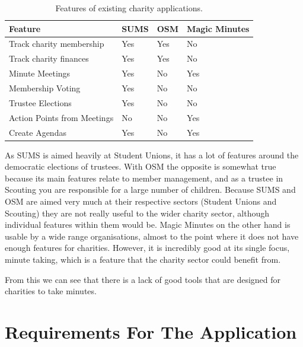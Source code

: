 \documentclass{UoYCSproject}
\begin{document}
\begin{table}[]
\begin{center}
\caption{ Features of existing charity applications.}
\label{table:existing_solutions}
\begin{tabular}{llll}
\textbf{Feature}            & \textbf{SUMS} & \textbf{OSM} & \textbf{Magic Minutes} \\ \hline
Track charity membership    & Yes           & Yes          & No                     \\
Track charity finances      & Yes           & Yes          & No                     \\
Minute Meetings             & Yes           & No           & Yes                    \\
Membership Voting           & Yes           & No           & No                     \\
Trustee Elections           & Yes           & No           & No                     \\
Action Points from Meetings & No            & No           & Yes                    \\
Create Agendas              & Yes           & No           & Yes                   
\end{tabular}
\end{center}
\end{table}

As SUMS is aimed heavily at Student Unions, it has a lot of features around the democratic elections of trustees. With OSM the opposite is somewhat true because its main features relate to member management, and as a trustee in Scouting you are responsible for a large number of children. Because SUMS and OSM are aimed very much at their respective sectors (Student Unions and Scouting) they are not really useful to the wider charity sector, although individual features within them would be. Magic Minutes on the other hand is usable by a wide range organisations, almost to the point where it does not have enough features for charities. However, it is incredibly good at its single focus, minute taking, which is a feature that the charity sector could benefit from.

From this we can see that there is a lack of good tools that are designed for charities to take minutes. 


\section{Requirements For The Application}
\end{document}
